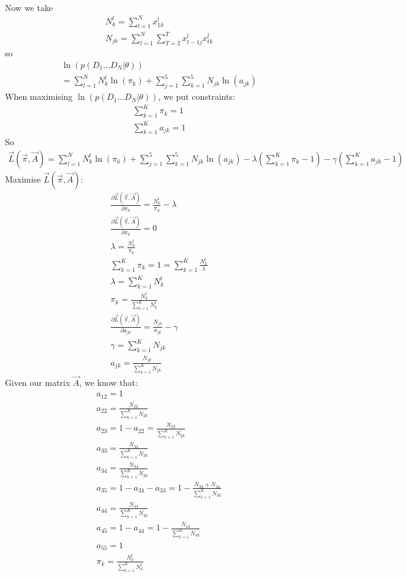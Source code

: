 \documentclass[12pt,twoside]{article}
\begin{document}
\begin{enumerate}[(i)]
\begin{align}
\end{align}
Now we take
\begin{align}
N_k^l = \sum_{l=1}^N x_{1k}^l \\
N_{jk} = \sum_{l=1}^N \sum_{T=2}^T x_{t-1j}^l x_{tk}^l  
\end{align}
so
\begin{align}
\ln(p(D_1 ... D_N | \theta)) \\
= \sum_{l=1}^{N}N_k^l \ln (\pi_k) +  \sum_{j=1}^5 \sum_{k=1}^5  N_{jk} \ln( a_{jk} )
\end{align}
When maximising $\ln(p(D_1 ... D_N | \theta)) $, we put constraints:
\begin{align}
\sum_{k=1}^{K}\pi_k = 1\\
\sum_{k=1}^{K} a_{jk} = 1
\end{align}
So
\begin{align}
\vec{L}(\vec{\pi}, \vec{A}) = \sum_{l=1}^{N}N_k^l \ln (\pi_k) +  \sum_{j=1}^5 \sum_{k=1}^5  N_{jk} \ln (a_{jk}) - \lambda (\sum_{k=1}^{K}\pi_k - 1) - \gamma (\sum_{k=1}^{K} a_{jk} -1 )
\end{align}
Maximise $\vec{L}(\vec{\pi}, \vec{A})$:
\begin{align}
 \frac{\partial \vec{L}(\vec{\pi}, \vec{A})}{\partial \pi_k} = \frac{N_k^l}{\pi_k} - \lambda  \\
\frac{\partial  \vec{L}(\vec{\pi}, \vec{A})}{\partial \pi_k} = 0 \\
\lambda = \frac{N_k^l}{\pi_k} \\
\sum_{k=1}^{K}\pi_k = 1 = \sum_{k=1}^{K} \frac{N_k^l}{\lambda}\\
\lambda = \sum_{k=1}^{K} N_k^l\\
\pi_k = \frac{N_k^l}{\sum_{k=1}^{K} N_k^l} \\
\frac{\partial \vec{L}(\vec{\pi}, \vec{A})}{\partial a_{jk}} = \frac{N_{jk} }{a_{jk}} - \gamma \\
\gamma =  \sum_{k=1}^{K} N_{jk} \\
a_{jk} = \frac{N_{jk}}{\sum_{k=1}^{K} N_{jk}} 
\end{align}
Given our matrix $\vec{A}$, we know that:
\begin{align}
a_{12} = 1 \\
a_{22} = \frac{N_{22}}{\sum_{k=1}^{K} N_{2k}} \\
a_{23} = 1-a_{22} = \frac{N_{22}}{\sum_{k=1}^{K} N_{2k}} \\
a_{33} =  \frac{N_{33}}{\sum_{k=1}^{K} N_{3k}} \\
a_{34} =  \frac{N_{34}}{\sum_{k=1}^{K} N_{3k}} \\
a_{35} = 1- a_{34} - a_{33} = 1- \frac{N_{33} + N_{34}}{\sum_{k=1}^{K} N_{3k}} \\
a_{44} =  \frac{N_{44}}{\sum_{k=1}^{K} N_{4k}} \\
a_{45} = 1- a_{44} = 1-  \frac{N_{44}}{\sum_{k=1}^{K} N_{4k}} \\
a_{55} = 1 \\
\pi_k = \frac{N_k^l}{\sum_{k=1}^{K} N_k^l} 
\end{align}



\end{enumerate}
\end{document}
